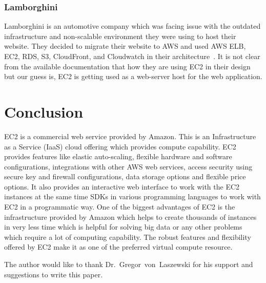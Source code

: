 \subsubsection{Lamborghini}
Lamborghini is an automotive company which was facing issue with the
outdated infrastructure and non-scalable environment they were using
to host their website. They decided to migrate their website to AWS
and used AWS ELB, EC2, RDS, S3, CloudFront, and Cloudwatch in their
architecture~\cite{hid-sp18-402-www-aws-ec2-lamborghini}. It is not
clear from the available documentation that how they are using EC2 in
their design but our guess is, EC2 is getting used as a web-server
host for the web application.

\section{Conclusion}
EC2 is a commercial web service provided by Amazon. This is an
Infrastructure as a Service (IaaS) cloud offering which provides
compute capability. EC2 provides features like elastic auto-scaling,
flexible hardware and software configurations, integrations with other
AWS web services, access security using secure key and firewall
configurations, data storage options and flexible price options. It
also provides an interactive web interface to work with the EC2
instances at the same time SDKs in various programming languages to
work with EC2 in a programmatic way. One of the biggest advantages of
EC2 is the infrastructure provided by Amazon which helps to create
thousands of instances in very less time which is helpful for solving
big data or any other problems which require a lot of computing
capability. The robust features and flexibility offered by EC2 make it
as one of the preferred virtual compute resource.

\begin{acks}

  The author would like to thank Dr.~Gregor~von~Laszewski for his
  support and suggestions to write this paper.

\end{acks}


 
